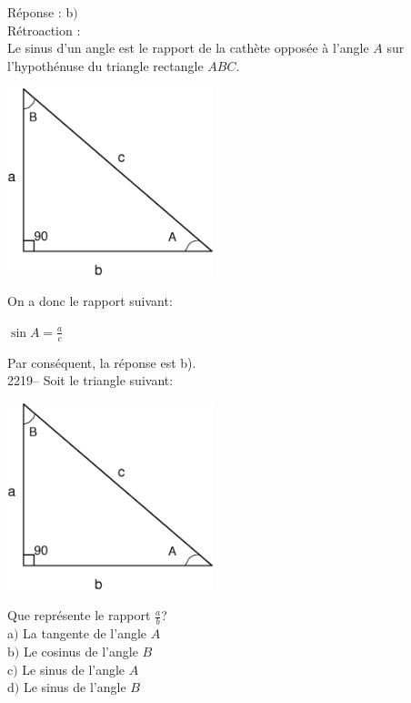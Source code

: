 \documentclass[letterpaper, 12pt]{article}
\begin{document}
R\'eponse : b$)$\\

R\'etroaction :\\
Le sinus d'un angle est le rapport de la cath\`ete oppos\'ee \`a l'angle $A$ sur l'hypoth\'enuse du triangle rectangle $ABC$.\\
\begin{center}
 \includegraphics[width=6cm,bb=14 14 591 533]{Triangle_rectangle2.eps}
\end{center}
On a donc le rapport suivant:
\begin{center}
 $\sin{A} = \frac{a}{c}$
\end{center}
Par cons\'equent, la r\'eponse est b).\\

2219-- Soit le triangle suivant: \\
\begin{center}
 \includegraphics[width=6cm,bb=14 14 591 533]{Triangle_rectangle2.eps}
\end{center}
Que repr\'esente le rapport $\frac{a}{b}$?\\

a$)$ La tangente de l'angle $A$\\
b$)$ Le cosinus de l'angle $B$\\
c$)$ Le sinus de l'angle $A$\\
d$)$ Le sinus de l'angle $B$\\
\end{document}
